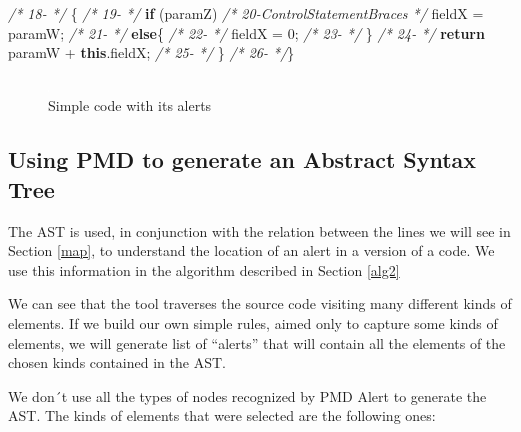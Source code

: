 \documentclass[
]{article}
\newenvironment{Shaded}{\begin{snugshade}}{\end{snugshade}}
\newcommand{\CommentTok}[1]{\textcolor[rgb]{0.56,0.35,0.01}{\textit{#1}}}
\newcommand{\DecValTok}[1]{\textcolor[rgb]{0.00,0.00,0.81}{#1}}
\newcommand{\FunctionTok}[1]{\textcolor[rgb]{0.00,0.00,0.00}{#1}}
\newcommand{\KeywordTok}[1]{\textcolor[rgb]{0.13,0.29,0.53}{\textbf{#1}}}
\newcommand{\NormalTok}[1]{#1}
\begin{document}
\begin{Shaded}
\begin{Highlighting}[]
\CommentTok{/* 18-                                   */}\NormalTok{    \{}
\CommentTok{/* 19-                                   */}        \KeywordTok{if}\NormalTok{ (paramZ)}
\CommentTok{/* 20-ControlStatementBraces             */}\NormalTok{            fieldX = paramW;}
\CommentTok{/* 21-                                   */}        \KeywordTok{else}\NormalTok{\{}
\CommentTok{/* 22-                                   */}\NormalTok{            fieldX = }\DecValTok{0}\NormalTok{;}
\CommentTok{/* 23-                                   */}\NormalTok{     \}}
\CommentTok{/* 24-                                   */}        \KeywordTok{return}\NormalTok{ paramW + }\KeywordTok{this}\NormalTok{.}\FunctionTok{fieldX}\NormalTok{;}
\CommentTok{/* 25-                                   */}\NormalTok{     \}}
\CommentTok{/* 26-                                   */}\NormalTok{\}  }
\end{Highlighting}
\end{Shaded}

\normalsize

\begin{figure}
\centering
\includegraphics{figures/fake.png}
\caption{Simple code with its alerts \label{simple_code}}
\end{figure}

\subsection{Using PMD to generate an Abstract Syntax Tree }\label{ast}

The AST is used, in conjunction with the relation between the lines we
will see in Section \ref{map}, to understand the location of an alert in
a version of a code. We use this information in the algorithm described
in Section \ref{alg2}

We can see that the tool traverses the source code visiting many
different kinds of elements. If we build our own simple rules, aimed
only to capture some kinds of elements, we will generate list of
``alerts'' that will contain all the elements of the chosen kinds
contained in the AST.

\newpage

We don´t use all the types of nodes recognized by PMD Alert to generate
the AST. The kinds of elements that were selected are the following
ones:
\end{document}
